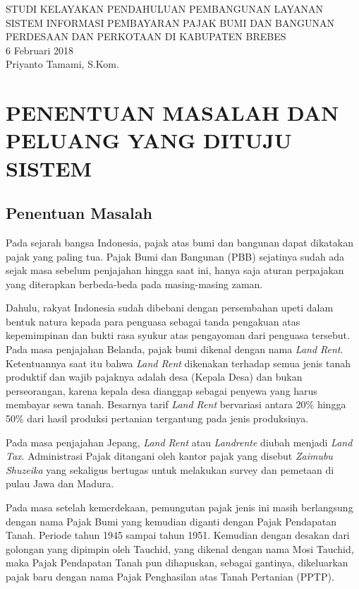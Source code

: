 \documentclass[pdftex,12pt, oneside]{article}
\begin{document}
%
\begin{center}
{\large STUDI KELAYAKAN PENDAHULUAN PEMBANGUNAN LAYANAN SISTEM INFORMASI PEMBAYARAN PAJAK BUMI DAN BANGUNAN PERDESAAN DAN PERKOTAAN DI KABUPATEN BREBES}
\\[1cm]
6 Februari 2018\\
Priyanto Tamami, S.Kom.
\end{center}

\section{PENENTUAN MASALAH DAN PELUANG YANG DITUJU SISTEM}

\subsection{Penentuan Masalah}

Pada sejarah bangsa Indonesia, pajak atas bumi dan bangunan dapat dikatakan pajak yang paling tua. Pajak Bumi dan Bangunan (PBB) sejatinya sudah ada sejak masa sebelum penjajahan hingga saat ini, hanya saja aturan perpajakan yang diterapkan berbeda-beda pada masing-masing zaman.

Dahulu, rakyat Indonesia sudah dibebani dengan persembahan upeti dalam bentuk natura kepada para penguasa sebagai tanda pengakuan atas kepemimpinan dan bukti rasa syukur atas pengayoman dari penguasa tersebut. Pada masa penjajahan Belanda, pajak bumi dikenal dengan nama \textit{Land Rent}. Ketentuannya saat itu bahwa \textit{Land Rent} dikenakan terhadap semua jenis tanah produktif dan wajib pajaknya adalah desa (Kepala Desa) dan bukan perseorangan, karena kepala desa dianggap sebagai penyewa yang harus membayar sewa tanah. Besarnya tarif \textit{Land Rent} bervariasi antara 20\% hingga 50\% dari hasil produksi pertanian tergantung pada jenis produksinya.

Pada masa penjajahan Jepang, \textit{Land Rent} atau \textit{Landrente} diubah menjadi \textit{Land Tax}. Administrasi Pajak ditangani oleh kantor pajak yang disebut \textit{Zaimubu Shuzeika} yang sekaligus bertugas untuk melakukan survey dan pemetaan di pulau Jawa dan Madura.

Pada masa setelah kemerdekaan, pemungutan pajak jenis ini masih berlangsung dengan nama Pajak Bumi yang kemudian diganti dengan Pajak Pendapatan Tanah. Periode tahun 1945 sampai tahun 1951. Kemudian dengan desakan dari golongan yang dipimpin oleh Tauchid, yang dikenal dengan nama Mosi Tauchid, maka Pajak Pendapatan Tanah pun dihapuskan, sebagai gantinya, dikeluarkan pajak baru dengan nama Pajak Penghasilan atas Tanah Pertanian (PPTP).
\end{document}
